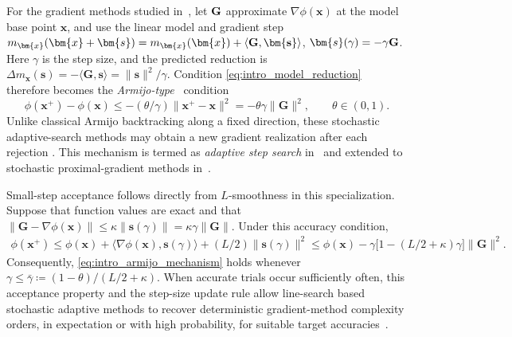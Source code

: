 \documentclass{article}
\begin{document}
For the gradient methods studied in~\cite{Cartis2018,courtny,Albert2021,Xie2024},  let $\bf{G}$ approximate $\nabla\phi(\bm{x})$ at the model base point $\bm{x}$, and use the linear model and gradient step $m_{\bm{x}}(\bm{x}+\bm{s})=m_{\bm{x}}(\bm{x})+\langle\bf{G},\bm{s}\rangle$, 
$\bm{s}(\gamma)=-\gamma\bf{G}$. Here $\gamma$ is the step size, and the predicted reduction is $\Delta m_{\bm{x}}(\bm{s})=-\langle\mathbf{G},\bm{s}\rangle=\|\bm{s}\|^2/\gamma$. Condition
\eqref{eq:intro_model_reduction} therefore becomes the \emph{Armijo-type}~\cite{Armijo1966} condition
\begin{equation}\label{eq:intro_armijo_mechanism}
\phi(\bm{x}^+)-\phi(\bm{x})
\le
-({\theta}/{\gamma})\|\bm{x}^+-\bm{x}\|^2
=
-\theta\gamma\|\mathbf{G}\|^2,
\qquad
\theta\in(0,1).
\end{equation} Unlike classical Armijo backtracking along a fixed direction, these
stochastic adaptive-search methods may obtain a new gradient realization after each rejection 
\cite{courtny,Albert2021,Xie2024,
scheinberg2025stochasticadaptiveoptimizationunreliable}. This  mechanism  is termed as \emph{adaptive step search} in~\cite{Xie2024}
and extended to stochastic proximal-gradient methods in~\cite{stoFISTA}.

Small-step acceptance follows directly from \(L\)-smoothness in this specialization. Suppose
that function values are exact and that 
$\|\mathbf{G}-\nabla\phi(\bm{x})\|
\le
\kappa\|\bm{s}(\gamma)\|
=
\kappa\gamma\|\mathbf{G}\|$.
Under this accuracy condition, 
\[
\begin{aligned}
\phi(\bm{x}^+)
\le
\phi(\bm{x})
+\langle\nabla\phi(\bm{x}),\bm{s}(\gamma)\rangle
+({L}/{2})\|\bm{s}(\gamma)\|^2
\le
\phi(\bm{x})
-\gamma\bigl[1-(L/2+\kappa)\gamma\bigr]
\|\mathbf{G}\|^2.
\end{aligned}
\]
Consequently, \eqref{eq:intro_armijo_mechanism} holds whenever
$\gamma
\le
\bar\gamma
\coloneqq 
{(1-\theta)}/{(L/2+\kappa)}$.
When accurate trials occur sufficiently often, this acceptance
property and the step-size update rule allow line-search based  stochastic adaptive 
methods to recover deterministic gradient-method complexity orders,
in expectation or with high probability, for suitable target
accuracies~\cite{Cartis2018,courtny,Albert2021,Xie2024,
scheinberg2025stochasticadaptiveoptimizationunreliable}.
\end{document}
